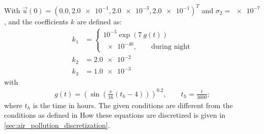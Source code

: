 With $\vec{u}(0) = (0.0, \num{2.0e-1}, \num{2.0e-3}, \num{2.0e-1})^T$ and $\sigma_2 = \num{e-7}$, and the coefficients $k$ are defined as:
\begin{align}
    k_1 & = \begin{cases}
        10^{-5} \exp{(7\ {\mathit g}(t))}
        \\
        \num{e-40}, \qquad \text{during  night}
    \end{cases}
    \\
    k_2 & = \num{2.0e-2}
    \\
    k_3 & = \num{1.0e-3}
\end{align}
with
\begin{align}
    {\mathit g}(t) =\left(\sin\left(\frac{\pi}{16} (t_h - 4)\right)\right)^{0.2}, \qquad t_h = \frac{t}{3600};
\end{align}
where $t_h$ is the time in hours.
The given conditions are different from the conditions as defined in \citet[pg.\ 8]{HundsdorferAndVerwer2003}
How these equations are discretized is given in \autoref{sec:air_pollution_discretization}.
%

